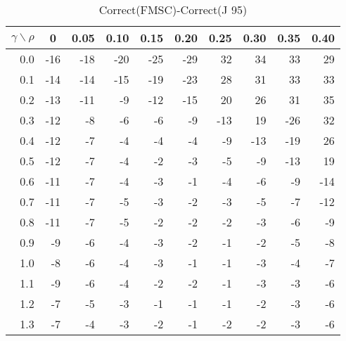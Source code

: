 \documentclass[12pt]{article}
\begin{document}
%
\begin{table}[!tbp]
\caption{Correct(FMSC)-Correct(J 95)}
 \begin{center}
 \begin{tabular}{r|rrrrrrrrr}\hline\hline
\multicolumn{1}{c|}{$\gamma\backslash\rho$}&\multicolumn{1}{c}{0}&\multicolumn{1}{c}{0.05}&\multicolumn{1}{c}{0.10}&\multicolumn{1}{c}{0.15}&\multicolumn{1}{c}{0.20}&\multicolumn{1}{c}{0.25}&\multicolumn{1}{c}{0.30}&\multicolumn{1}{c}{0.35}&\multicolumn{1}{c}{0.40}\tabularnewline
\hline
0.0&-16&-18&-20&-25&-29& 32& 34& 33& 29\tabularnewline
0.1&-14&-14&-15&-19&-23& 28& 31& 33& 33\tabularnewline
0.2&-13&-11& -9&-12&-15& 20& 26& 31& 35\tabularnewline
0.3&-12& -8& -6& -6& -9&-13& 19&-26& 32\tabularnewline
0.4&-12& -7& -4& -4& -4& -9&-13&-19& 26\tabularnewline
0.5&-12& -7& -4& -2& -3& -5& -9&-13& 19\tabularnewline
0.6&-11& -7& -4& -3& -1& -4& -6& -9&-14\tabularnewline
0.7&-11& -7& -5& -3& -2& -3& -5& -7&-12\tabularnewline
0.8&-11& -7& -5& -2& -2& -2& -3& -6& -9\tabularnewline
0.9& -9& -6& -4& -3& -2& -1& -2& -5& -8\tabularnewline
1.0& -8& -6& -4& -3& -1& -1& -3& -4& -7\tabularnewline
1.1& -9& -6& -4& -2& -2& -1& -3& -3& -6\tabularnewline
1.2& -7& -5& -3& -1& -1& -1& -2& -3& -6\tabularnewline
1.3& -7& -4& -3& -2& -1& -2& -2& -3& -6\tabularnewline
\hline
\end{tabular}

\end{center}

\end{table}
\end{document}
